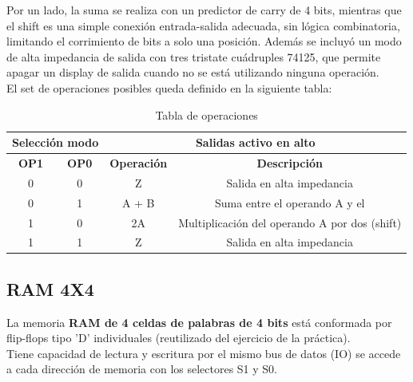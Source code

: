 \documentclass{sciposter}
\begin{document}
\begin{multicols*}{2}
Por un lado, la suma se realiza con un predictor de carry de 4 bits, mientras que el shift es una simple conexión entrada-salida adecuada, sin lógica combinatoria, limitando el corrimiento de bits a solo una posición.
Además se incluyó un modo de alta impedancia de salida con tres tristate cuádruples 74125, que permite apagar un display de salida cuando no se está utilizando ninguna operación.\\
El set de operaciones posibles queda definido en la siguiente tabla:

\begin{table}[h]
    \centering
    \begin{tabular}{|c|c|c|c|}
        \hline
        \multicolumn{2}{|c|}{\textbf{Selección modo}} & \multicolumn{2}{|c|}{\textbf{Salidas activo en alto}} \\
        \hline
        \textbf{OP1} & \textbf{OP0} & \textbf{Operación} & \textbf{Descripción} \\
        \hline
        0 & 0 & Z & Salida en alta impedancia \\
        0 & 1 & A + B & Suma entre el operando A y el  \\
        1 & 0 & 2A & Multiplicación del operando A por dos (shift) \\
        1 & 1 & Z & Salida en alta impedancia \\
        \hline
    \end{tabular}
    \caption{Tabla de operaciones}
    \label{tab:operaciones}
\end{table}


\subsection{RAM 4X4}
La memoria \textbf{RAM de 4 celdas de palabras de 4 bits} está conformada por flip-flops tipo 'D' individuales (reutilizado del ejercicio de la práctica).\\
Tiene capacidad de lectura y escritura por el mismo bus de datos (IO) se accede a cada dirección de memoria con los selectores S1 y S0.

\newpage


\end{multicols*}
\end{document}
